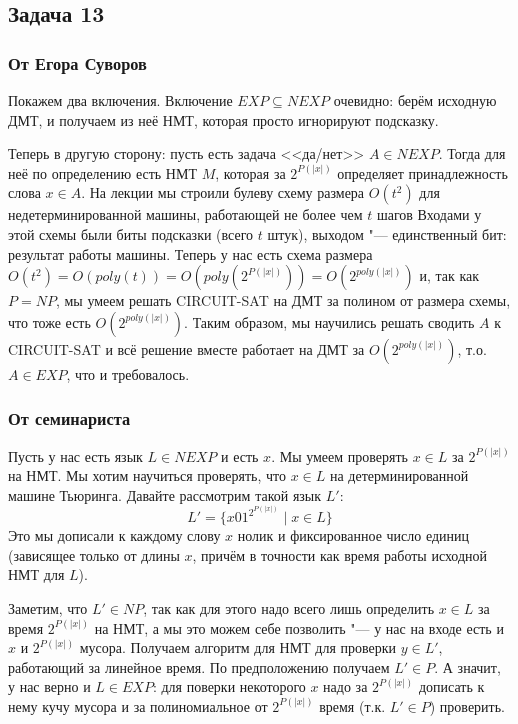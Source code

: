 \subsection{Задача 13}
	\subsubsection{От Егора Суворов}
		Покажем два включения.
		Включение $EXP \subseteq NEXP$ очевидно: берём исходную ДМТ, и получаем
		из неё НМТ, которая просто игнорируют подсказку.

		Теперь в другую сторону: пусть есть задача <<да/нет>> $A \in NEXP$.
		Тогда для неё по определению есть НМТ $M$, которая за $2^{P(|x|)}$ определяет
		принадлежность слова $x \in A$.
		На лекции мы строили булеву схему размера $O(t^2)$ для недетерминированной машины, работающей не более чем $t$ шагов
		Входами у этой схемы были биты подсказки (всего $t$ штук), выходом "--- единственный бит: результат работы машины.
		Теперь у нас есть схема размера $O(t^2)=O(poly(t))=O(poly(2^{P(|x|)}))=O(2^{poly(|x|)})$ и,
		так как $P=NP$, мы умеем решать CIRCUIT-SAT на ДМТ за полином от размера схемы, что тоже есть $O(2^{poly(|x|)})$.
		Таким образом, мы научились решать сводить $A$ к CIRCUIT-SAT и всё решение вместе работает на ДМТ
		за $O(2^{poly(|x|)})$, т.о. $A \in EXP$, что и требовалось.

	\subsubsection{От семинариста}
		Пусть у нас есть язык $L \in NEXP$ и есть $x$.
		Мы умеем проверять $x \in L$ за $2^{P(|x|)}$ на НМТ.
		Мы хотим научиться проверять, что $x\in L$ на детерминированной машине Тьюринга.
		Давайте рассмотрим такой язык $L'$:
		\[ L' = \{ x 0 1^{2^{P(|x|)}} \mid x \in L \} \]
		Это мы дописали к каждому слову $x$ нолик и фиксированное число единиц (зависящее только от длины $x$,
		причём в точности как время работы исходной НМТ для $L$).

		Заметим, что $L' \in NP$, так как для этого надо всего лишь определить
		$x \in L$ за время $2^{P(|x|)}$ на НМТ, а мы это можем себе позволить "--- у нас на входе
		есть и $x$ и $2^{P(|x|)}$ мусора.
		Получаем алгоритм для НМТ для проверки $y \in L'$, работающий за линейное время.
		По предположению получаем $L' \in P$.
		А значит, у нас верно и $L \in EXP$: для поверки некоторого $x$ надо за $2^{P(|x|)}$ дописать
		к нему кучу мусора и за полиномиальное от $2^{P(|x|)}$ время (т.к. $L' \in P$) проверить.

